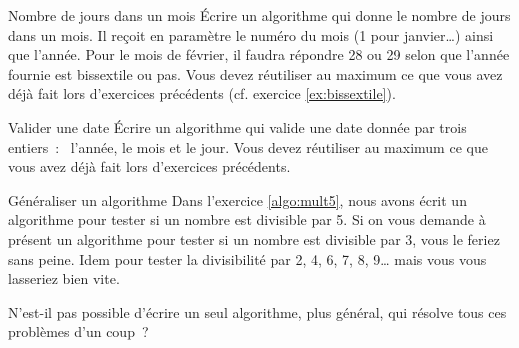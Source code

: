 	\begin{Exercice}{Nombre de jours dans un mois}
		Écrire un algorithme qui donne le nombre de jours dans un mois.
		Il reçoit en paramètre le numéro du mois (1 pour janvier\dots)
		ainsi que l’année.
		Pour le mois de février, 
		il faudra répondre 28 ou 29 selon que l’année fournie
		est bissextile ou pas.
		Vous devez réutiliser au maximum ce que vous avez déjà fait
		lors d’exercices précédents (cf. exercice \vref{ex:bissextile}).
	\end{Exercice}

	\begin{Exercice}{Valider une date}
		Écrire un algorithme qui valide 
		une date donnée par trois entiers~:~ l’année, le mois et le jour.
		Vous devez réutiliser au maximum ce que vous avez déjà fait
		lors d’exercices précédents.
	\end{Exercice}
	
	\begin{Exercice}{Généraliser un algorithme}
		Dans l’exercice \vref{algo:mult5},
		nous avons écrit un algorithme 
		pour tester si un nombre est divisible par 5.
		Si on vous demande à présent
		un algorithme pour tester si un nombre est divisible par 3,
		vous le feriez sans peine.
		Idem pour tester la divisibilité par 2, 4, 6, 7, 8, 9\dots{}
		mais vous vous lasseriez bien vite.
		
		N’est-il pas possible d’écrire un seul algorithme,
		plus général, qui résolve tous ces problèmes d’un coup~?  
	\end{Exercice}
	
